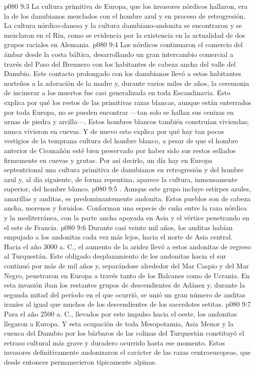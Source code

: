 \vs p080 9:3 La cultura primitiva de Europa, que los invasores nórdicos hallaron, era la de los danubianos mezclados con el hombre azul y en proceso de retrogresión. La cultura nórdico\hyp{}danesa y la cultura danubiano\hyp{}andonita se encontraron y se mezclaron en el Rin, como se evidencia por la existencia en la actualidad de dos grupos raciales en Alemania.
\vs p080 9:4 Los nórdicos continuaron el comercio del ámbar desde la costa báltica, desarrollando un gran intercambio comercial a través del Paso del Brennero con los habitantes de cabeza ancha del valle del Danubio. Este contacto prolongado con los danubianos llevó a estos habitantes norteños a la adoración de la madre y, durante varios miles de años, la ceremonia de incinerar a los muertos fue casi generalizada en toda Escandinavia. Esto explica por qué los restos de las primitivas razas blancas, aunque están enterrados por toda Europa, no se pueden encontrar ---tan solo se hallan sus cenizas en urnas de piedra y arcilla---. Estos hombres blancos también construían viviendas; nunca vivieron en cuevas. Y de nuevo esto explica por qué hay tan pocos vestigios de la temprana cultura del hombre blanco, a pesar de que el hombre anterior de Cromañón esté bien preservado por haber sido sus restos sellados firmemente en cuevas y grutas. Por así decirlo, un día hay en Europa septentrional una cultura primitiva de danubianos en retrogresión y del hombre azul y, al día siguiente, de forma repentina, aparece la cultura, inmensamente superior, del hombre blanco.
\vs p080 9:5 . Aunque este grupo incluye estirpes azules, amarillas y anditas, es predominantemente andonita. Estos pueblos son de cabeza ancha, morenos y fornidos. Conforman una especie de cuña entre la raza nórdica y la mediterránea, con la parte ancha apoyada en Asia y el vértice penetrando en el este de Francia.
\vs p080 9:6 Durante casi veinte mil años, los anditas habían empujado a los andonitas cada vez más lejos, hacia el norte de Asia central. Hacia el año 3000 a. C., el aumento de la aridez llevó a estos andonitas de regreso al Turquestán. Este obligado desplazamiento de los andonitas hacia el sur continuó por más de mil años y, separándose alrededor del Mar Caspio y del Mar Negro, penetraron en Europa a través tanto de los Balcanes como de Ucrania. En esta invasión iban los restantes grupos de descendientes de Adánez y, durante la segunda mitad del período en el que ocurrió, se unió un gran número de anditas iraníes al igual que muchos de los descendientes de los sacerdotes setitas.
\vs p080 9:7 Para el año 2500 a. C., llevados por este impulso hacia el oeste, los andonitas llegaron a Europa. Y esta ocupación de toda Mesopotamia, Asia Menor y la cuenca del Danubio por los bárbaros de las colinas del Turquestán constituyó el retraso cultural más grave y duradero ocurrido hasta ese momento. Estos invasores definitivamente andonizaron el carácter de las razas centroeuropeas, que desde entonces permanecieron típicamente alpinas.
